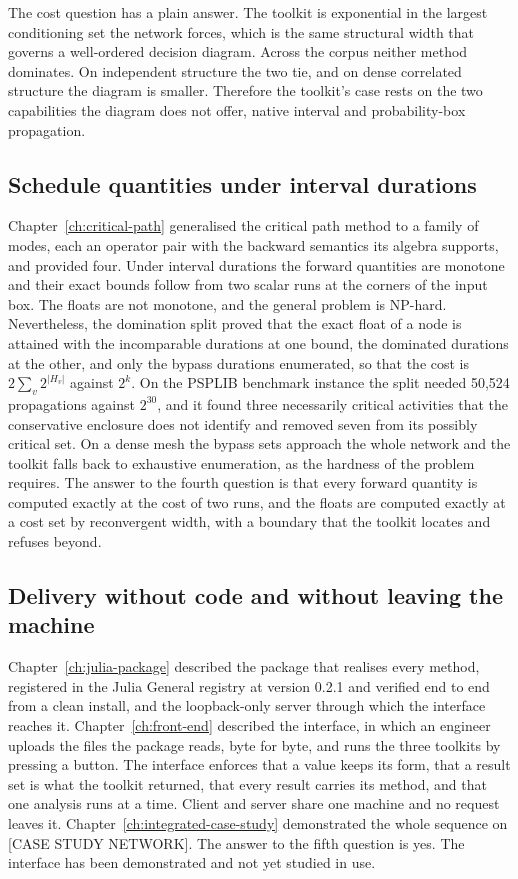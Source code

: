 \documentclass[12pt]{report}
\newcommand{\CaseStudyNetwork}{[CASE STUDY NETWORK]}
\begin{document}
The cost question has a plain answer. The toolkit is exponential in the largest conditioning
set the network forces, which is the same structural width that governs a well-ordered
decision diagram. Across the corpus neither method dominates. On independent structure the
two tie, and on dense correlated structure the diagram is smaller. Therefore the toolkit's
case rests on the two capabilities the diagram does not offer, native interval and
probability-box propagation.

\subsection{Schedule quantities under interval durations}

Chapter~\ref{ch:critical-path} generalised the critical path method to a family of modes,
each an operator pair with the backward semantics its algebra supports, and provided four.
Under interval durations the forward quantities are monotone and their exact bounds follow
from two scalar runs at the corners of the input box. The floats are not monotone, and the
general problem is NP-hard. Nevertheless, the domination split proved that the exact float
of a node is attained with the incomparable durations at one bound, the dominated durations
at the other, and only the bypass durations enumerated, so that the cost is
$2\sum_v 2^{|H_v|}$ against $2^k$. On the PSPLIB benchmark instance the split needed 50,524 propagations against
$2^{30}$, and it found three necessarily critical activities that the conservative enclosure
does not identify and removed seven from its possibly critical set. On a dense mesh the
bypass sets approach the whole network and the toolkit falls back to exhaustive
enumeration, as the hardness of the problem requires. The answer to the fourth question is that every forward quantity is computed exactly at
the cost of two runs, and the floats are computed exactly at a cost set by reconvergent
width, with a boundary that the toolkit locates and refuses beyond.

\subsection{Delivery without code and without leaving the machine}

Chapter~\ref{ch:julia-package} described the package that realises every method, registered
in the Julia General registry at version 0.2.1 and verified end to end from a clean install,
and the loopback-only server through which the interface reaches it.
Chapter~\ref{ch:front-end} described the interface, in which an engineer uploads the files
the package reads, byte for byte, and runs the three toolkits by pressing a button. The
interface enforces that a value keeps its form, that a result set is what the toolkit
returned, that every result carries its method, and that one analysis runs at a time.
Client and server share one machine and no request leaves it.
Chapter~\ref{ch:integrated-case-study} demonstrated the whole sequence on
\CaseStudyNetwork. The answer to the fifth question is yes. The interface has been
demonstrated and not yet studied in use.
\end{document}
